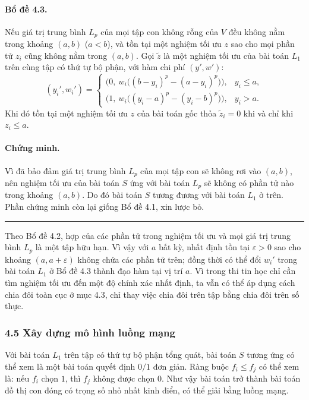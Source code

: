 \documentclass[11pt]{article}
\newcommand{\qedmark}{\hfill\rule{0.7ex}{0.7ex}}
\begin{document}
\paragraph{Bổ đề 4.3.}
Nếu giá trị trung bình \(L_p\) của mọi tập con không rỗng của \(V\) đều không
nằm trong khoảng \((a,b)\) (\(a<b\)), và tồn tại một nghiệm tối ưu \(z\) sao cho
mọi phần tử \(z_i\) cũng không nằm trong \((a,b)\). Gọi \(\tilde z\) là một
nghiệm tối ưu của bài toán \(L_1\) trên cùng tập có thứ tự bộ phận, với hàm chi
phí \((y',w')\):
\[
  (y_i',w_i')=
  \begin{cases}
    \bigl(0,\ w_i\bigl((b-y_i)^p-(a-y_i)^p\bigr)\bigr), & y_i\le a,\\
    \bigl(1,\ w_i\bigl((y_i-a)^p-(y_i-b)^p\bigr)\bigr), & y_i>a.
  \end{cases}
\]
Khi đó tồn tại một nghiệm tối ưu \(z\) của bài toán gốc thỏa
\(\tilde z_i=0\) khi và chỉ khi \(z_i\le a\).

\paragraph{Chứng minh.}
Vì đã bảo đảm giá trị trung bình \(L_p\) của mọi tập con sẽ không rơi vào
\((a,b)\), nên nghiệm tối ưu của bài toán \(S\) ứng với bài toán \(L_p\) sẽ
không có phần tử nào trong khoảng \((a,b)\). Do đó bài toán \(S\) tương đương
với bài toán \(L_1\) ở trên. Phần chứng minh còn lại giống Bổ đề 4.1, xin lược
bỏ. \qedmark

Theo Bổ đề 4.2, hợp của các phần tử trong nghiệm tối ưu và mọi giá trị trung
bình \(L_p\) là một tập hữu hạn. Vì vậy với \(a\) bất kỳ, nhất định tồn tại
\(\varepsilon>0\) sao cho khoảng \((a,a+\varepsilon)\) không chứa các phần tử
trên; đồng thời có thể đổi \(w_i'\) trong bài toán \(L_1\) ở Bổ đề 4.3 thành
đạo hàm tại vị trí \(a\). Vì trong thi tin học chỉ cần tìm nghiệm tối ưu đến
một độ chính xác nhất định, ta vẫn có thể áp dụng cách chia đôi toàn cục ở mục
4.3, chỉ thay việc chia đôi trên tập bằng chia đôi trên số thực.

\subsubsection*{4.5 Xây dựng mô hình luồng mạng}

Với bài toán \(L_1\) trên tập có thứ tự bộ phận tổng quát, bài toán \(S\) tương
ứng có thể xem là một bài toán quyết định \(0/1\) đơn giản. Ràng buộc
\(f_i\le f_j\) có thể xem là: nếu \(f_i\) chọn \(1\), thì \(f_j\) không được chọn
\(0\). Như vậy bài toán trở thành bài toán đồ thị con đóng có trọng số nhỏ
nhất kinh điển, có thể giải bằng luồng mạng.
\end{document}
